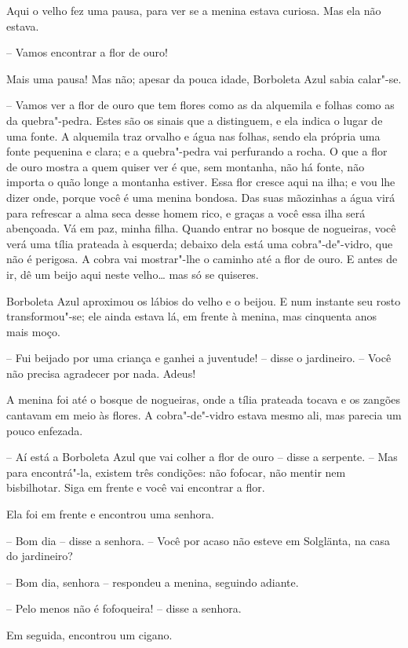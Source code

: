 Aqui o velho fez uma pausa, para ver se a menina estava curiosa. Mas ela
não estava.

-- Vamos encontrar a flor de ouro!

Mais uma pausa! Mas não; apesar da pouca idade, Borboleta Azul sabia
calar"-se.

-- Vamos ver a flor de ouro que tem flores como as da alquemila e folhas
como as da quebra"-pedra. Estes são os sinais que a distinguem, e ela
indica o lugar de uma fonte. A alquemila traz orvalho e água nas
folhas, sendo ela própria uma fonte pequenina e clara; e a
quebra"-pedra vai perfurando a rocha. O que a flor de ouro mostra a
quem quiser ver é que, sem montanha, não há fonte, não importa o quão
longe a montanha estiver. Essa flor cresce aqui na ilha; e vou lhe
dizer onde, porque você é uma menina bondosa. Das suas mãozinhas a água
virá para refrescar a alma seca desse homem rico, e graças a você essa
ilha será abençoada. Vá em paz, minha filha. Quando entrar no bosque de
nogueiras, você verá uma tília prateada à esquerda; debaixo dela está
uma cobra"-de"-vidro, que não é perigosa. A cobra vai mostrar"-lhe o
caminho até a flor de ouro. E antes de ir, dê um beijo aqui neste
velho\ldots{} mas só se quiseres. 

Borboleta Azul aproximou os lábios do velho e o beijou. E num instante
seu rosto transformou"-se; ele ainda estava lá, em frente à menina,
mas cinquenta anos mais moço.

-- Fui beijado por uma criança e ganhei a juventude! -- disse o
jardineiro. -- Você não precisa agradecer por nada. Adeus!

A menina foi até o bosque de nogueiras, onde a tília prateada tocava e
os zangões cantavam em meio às flores. A cobra"-de"-vidro estava
mesmo ali, mas parecia um pouco enfezada.

-- Aí está a Borboleta Azul que vai colher a flor de ouro -- disse a
serpente. -- Mas para encontrá"-la, existem três condições: não
fofocar, não mentir nem bisbilhotar. Siga em frente e você vai
encontrar a flor. 

Ela foi em frente e encontrou uma senhora.

-- Bom dia -- disse a senhora. -- Você por acaso não esteve em Solglänta,
na casa do jardineiro?

-- Bom dia, senhora -- respondeu a menina, seguindo adiante.

-- Pelo menos não é fofoqueira! -- disse a senhora.

Em seguida, encontrou um cigano.

